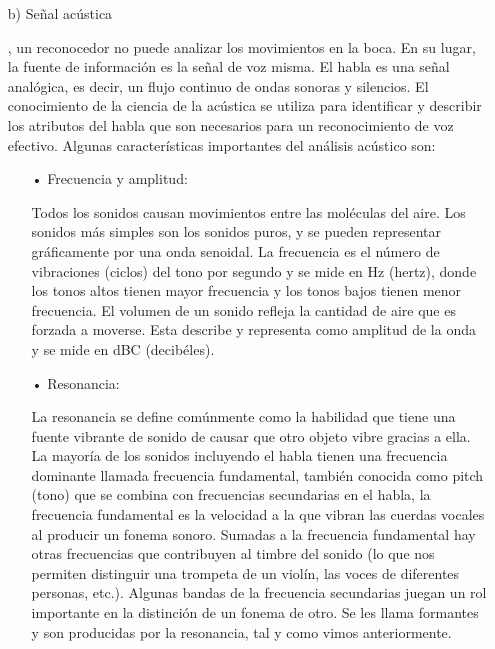 \begin{enumerate}
\newpage
\item[b)]Señal acústica
\par
\cite{luis}, un reconocedor no puede analizar los movimientos en la boca. En su lugar, la fuente de información es la señal de voz misma. El habla es una señal analógica, es decir, un flujo continuo de ondas sonoras y silencios. El conocimiento de la ciencia de la acústica se utiliza para identificar y describir los atributos del habla que son necesarios para un reconocimiento de voz efectivo.
\vskip 0.5cm
Algunas características importantes del análisis acústico son:
\begin{enumerate}
\item[•]Frecuencia y amplitud:
\par
Todos los sonidos causan movimientos entre las moléculas del aire. Los sonidos más simples son los sonidos puros, y se pueden representar gráficamente por una onda senoidal. 
\vskip 0.5cm
La frecuencia es el número de vibraciones (ciclos) del tono por segundo y se mide en Hz (hertz), donde los tonos altos tienen mayor frecuencia y los tonos bajos tienen menor frecuencia.
\vskip 0.5cm
El volumen de un sonido refleja la cantidad de aire que es forzada a moverse. Esta describe y representa como amplitud de la onda y se mide en dBC (decibéles).
\vskip 0.5cm

\item[•]Resonancia:
\par
La resonancia se define comúnmente como la habilidad que tiene una fuente vibrante de sonido de causar que otro objeto vibre gracias a ella. La mayoría de los sonidos incluyendo el habla tienen una frecuencia dominante llamada frecuencia fundamental, también conocida como pitch (tono) que se combina con frecuencias secundarias en el habla, la frecuencia fundamental es la velocidad a la que vibran las cuerdas vocales al producir un fonema sonoro. Sumadas a la frecuencia fundamental hay otras frecuencias que contribuyen al timbre del sonido (lo que nos permiten distinguir una trompeta de un violín, las voces de diferentes personas, etc.). Algunas bandas de la frecuencia secundarias juegan un rol importante en la distinción de un fonema de otro. Se les llama formantes y son producidas por la resonancia, tal y como vimos anteriormente.


\end{enumerate}
\end{enumerate}
